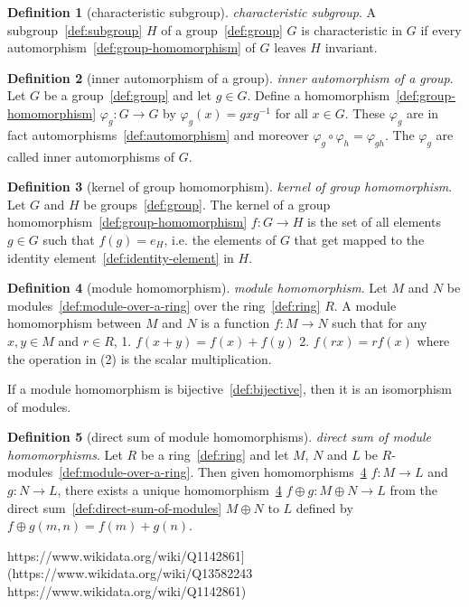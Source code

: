 \documentclass[12pt,a4paper]{article}
\theoremstyle{definition}
\newtheorem{definition}{Definition}
\begin{document}
\begin{definition}[characteristic subgroup]\label{def:characteristic-subgroup}
\emph{characteristic subgroup}. A subgroup~\ref{def:subgroup} $H$ of a group~\ref{def:group} $G$ is characteristic in $G$ if every automorphism~\ref{def:group-homomorphism} of $G$ leaves $H$ invariant.
\end{definition}

\begin{definition}[inner automorphism of a group]\label{def:inner-automorphism-of-a-group}
\emph{inner automorphism of a group}. Let $G$ be a group~\ref{def:group} and let $g\in G$. Define a homomorphism~\ref{def:group-homomorphism} $\varphi_g: G\to G$ by $\varphi_g(x) = gxg^{-1}$ for all $x\in G$. These $\varphi_g$ are in fact automorphisms~\ref{def:automorphism} and moreover $\varphi_g\circ\varphi_h = \varphi_{gh}$. The $\varphi_g$ are called inner automorphisms of $G$.
\end{definition}

\begin{definition}[kernel of group homomorphism]\label{def:kernel-of-group-homomorphism}
\emph{kernel of group homomorphism}. Let $G$ and $H$ be groups~\ref{def:group}. The kernel of a group homomorphism~\ref{def:group-homomorphism} $f:G\to H$ is the set of all elements $g\in G$ such that $f(g) = e_H$, i.e. the elements of $G$ that get mapped to the identity element~\ref{def:identity-element} in $H$.
\end{definition}

\begin{definition}[module homomorphism]\label{def:module-homomorphism}
\emph{module homomorphism}. Let $M$ and $N$ be modules~\ref{def:module-over-a-ring} over the ring~\ref{def:ring} $R$. A module homomorphism between $M$ and $N$ is a function $f:M\to N$ such that for any $x,y \in M$ and $r\in R$, 
1. $f(x+y) = f(x) + f(y)$
2. $f(rx) = rf(x)$
where the operation in (2) is the scalar multiplication.

If a module homomorphism is bijective~\ref{def:bijective}, then it is an isomorphism of modules.
\end{definition}

\begin{definition}[direct sum of module homomorphisms]\label{def:direct-sum-of-module-homomorphisms}
\emph{direct sum of module homomorphisms}. Let $R$ be a ring~\ref{def:ring} and let $M$, $N$ and $L$ be $R$-modules~\ref{def:module-over-a-ring}. Then given homomorphisms~\ref{def:module-homomorphism} $f:M\to L$ and $g:N\to L$, there exists a unique homomorphism~\ref{def:module-homomorphism} $f\oplus g:M\oplus N\to L$ from the direct sum~\ref{def:direct-sum-of-modules} $M\oplus N$ to $L$ defined by $f\oplus g(m,n) = f(m) + g(n)$. 


https://www.wikidata.org/wiki/Q1142861](https://www.wikidata.org/wiki/Q13582243
https://www.wikidata.org/wiki/Q1142861)
\end{definition}
\end{document}
